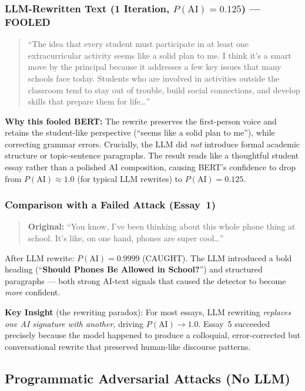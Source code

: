 \documentclass[11pt,a4paper]{article}
\begin{document}
\subsubsection*{LLM-Rewritten Text (1 Iteration, $P(\text{AI})=0.125$) — FOOLED}

\begin{quote}
``The idea that every student must participate in at least one extracurricular activity seems like a solid plan to me. I think it's a smart move by the principal because it addresses a few key issues that many schools face today. Students who are involved in activities outside the classroom tend to stay out of trouble, build social connections, and develop skills that prepare them for life\ldots''
\end{quote}

\textbf{Why this fooled BERT:} The rewrite preserves the first-person voice and retains the student-like perspective (``seems like a solid plan to me''), while correcting grammar errors. Crucially, the LLM did \emph{not} introduce formal academic structure or topic-sentence paragraphs. The result reads like a thoughtful student essay rather than a polished AI composition, causing BERT's confidence to drop from $P(\text{AI})\approx1.0$ (for typical LLM rewrites) to $P(\text{AI})=0.125$.

\subsubsection*{Comparison with a Failed Attack (Essay~1)}

\begin{quote}
\textbf{Original:} ``You know, I've been thinking about this whole phone thing at school. It's like, on one hand, phones are super cool\ldots''
\end{quote}

After LLM rewrite: $P(\text{AI})=0.9999$ (CAUGHT). The LLM introduced a bold heading (``\textbf{Should Phones Be Allowed in School?}'') and structured paragraphs — both strong AI-text signals that caused the detector to become \emph{more} confident.

\textbf{Key Insight} (the rewriting paradox): For most essays, LLM rewriting \emph{replaces one AI signature with another}, driving $P(\text{AI})\to1.0$. Essay~5 succeeded precisely because the model happened to produce a colloquial, error-corrected but conversational rewrite that preserved human-like discourse patterns.

\subsection{Programmatic Adversarial Attacks (No LLM)}
\end{document}

